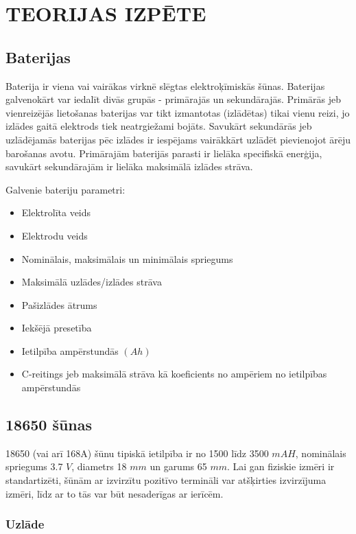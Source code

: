 \documentclass[12pt,fleqn,titlepage,oneside]{article}
\numberwithin{equation}{section}
\numberwithin{figure}{section}
\numberwithin{table}{section}
\begin{document}
\FloatBarrier
\newpage

\section{\texorpdfstring{\MakeUppercase{Teorijas izpēte}}{Teorijas izpēte}}

\subsection{Baterijas}

Baterija ir viena vai vairākas virknē slēgtas elektroķīmiskās šūnas.
Baterijas galvenokārt var iedalīt divās grupās - primārajās un sekundārajās.
Primārās jeb vienreizējās lietošanas baterijas var tikt izmantotas (izlādētas) tikai vienu reizi, jo izlādes gaitā elektrods tiek neatrgiežami bojāts.
Savukārt sekundārās jeb uzlādējamās baterijas pēc izlādes ir iespējams vairākkārt uzlādēt pievienojot ārēju barošanas avotu.
Primārajām baterijās parasti ir lielāka specifiskā enerģija, savukārt sekundārajām ir lielāka maksimālā izlādes strāva.

Galvenie bateriju parametri:
\begin{itemize}
	\item Elektrolīta veids
	\item Elektrodu veids
	\item Nominālais, maksimālais un minimālais spriegums
	\item Maksimālā uzlādes/izlādes strāva
	\item Pašizlādes ātrums
	\item Iekšējā presetība
	\item Ietilpība ampērstundās $(Ah)$
	\item C-reitings jeb maksimālā strāva kā koeficients no ampēriem no ietilpības ampērstundās
\end{itemize}

\subsection{18650 šūnas}

18650 (vai arī 168A) šūnu tipiskā ietilpība ir no 1500 līdz 3500 $mAH$, nominālais spriegums 3.7 $V$,
diametrs 18 $mm$ un garums 65 $mm$.\cite{18650cell}
Lai gan fiziskie izmēri ir standartizēti, šūnām ar izvirzītu pozitīvo termināli var atšķirties izvirzījuma izmēri,
līdz ar to tās var būt nesaderīgas ar ierīcēm.

\subsubsection{Uzlāde}
\end{document}
